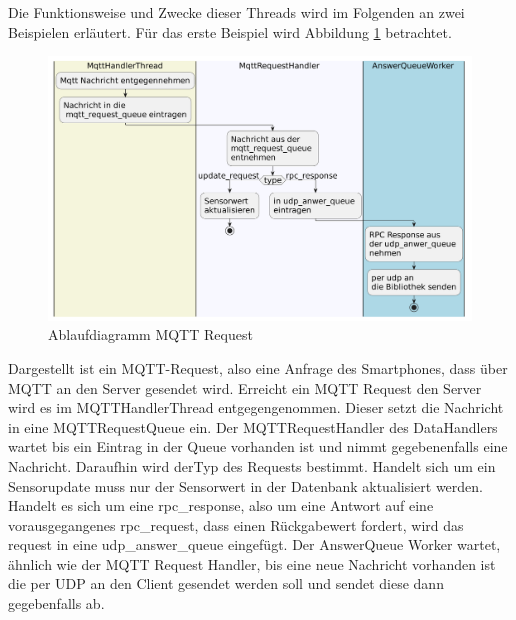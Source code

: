\documentclass[11pt,a4paper]{report}
\begin{document}
Die Funktionsweise und Zwecke dieser Threads wird im Folgenden an zwei Beispielen erläutert.
Für das erste Beispiel wird Abbildung \ref{fig:serverMqttReqPath} betrachtet.
\begin{figure}[htbp]
  \centering
  \includegraphics[width=\textwidth]{images/MqttRequestServerPath}
  \caption{Ablaufdiagramm MQTT Request}
  \label{fig:serverMqttReqPath}
\end{figure}
Dargestellt ist ein MQTT-Request, also eine Anfrage des Smartphones, dass über MQTT an den Server gesendet wird.
Erreicht ein MQTT Request den Server wird es im MQTTHandlerThread entgegengenommen.
Dieser setzt die Nachricht in eine MQTTRequestQueue ein.
Der MQTTRequestHandler des DataHandlers wartet bis ein Eintrag in der Queue vorhanden ist und nimmt gegebenenfalls eine Nachricht.
Daraufhin wird derTyp des Requests bestimmt.
Handelt sich um ein Sensorupdate muss nur der Sensorwert in der Datenbank aktualisiert werden.
Handelt es sich um eine rpc\_response, also um eine Antwort auf eine vorausgegangenes rpc\_request, dass einen Rückgabewert fordert, wird das request in eine udp\_answer\_queue eingefügt.
Der AnswerQueue Worker wartet, ähnlich wie der MQTT Request Handler, bis eine neue Nachricht vorhanden ist die per UDP an den Client gesendet werden soll und sendet diese dann gegebenfalls ab.
\end{document}
